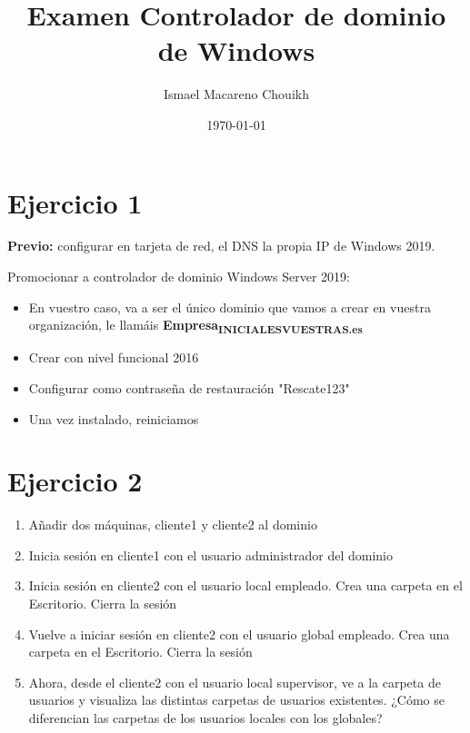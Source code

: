 \documentclass[11pt]{article}
\author{Ismael Macareno Chouikh}
\date{\today}
\title{Examen Controlador de dominio de Windows}
\begin{document}
\maketitle

\section{Ejercicio 1}
\label{sec:org68734ab}
\textbf{Previo:} configurar en tarjeta de red, el DNS la propia IP de Windows 2019.

Promocionar a controlador de dominio Windows Server 2019:
\begin{itemize}
\item En vuestro caso, va a ser el único dominio que vamos a crear en vuestra organización, le llamáis \textbf{Empresa\textsubscript{INICIALESVUESTRAS.es}}
\item Crear con nivel funcional 2016
\item Configurar como contraseña de restauración "Rescate123"
\item Una vez instalado, reiniciamos
\end{itemize}


\section{Ejercicio 2}
\label{sec:org2b82291}
\begin{enumerate}
\item Añadir dos máquinas, cliente1 y cliente2 al dominio
\item Inicia sesión en cliente1 con el usuario administrador del dominio
\item Inicia sesión en cliente2 con el usuario local empleado. Crea una carpeta en el Escritorio. Cierra la sesión
\item Vuelve a iniciar sesión en cliente2 con el usuario global empleado. Crea una carpeta en el Escritorio. Cierra la sesión
\item Ahora, desde el cliente2 con el usuario local supervisor, ve a la carpeta de usuarios y visualiza las distintas carpetas de usuarios existentes. ¿Cómo se diferencian las carpetas
de los usuarios locales con los globales?
\end{enumerate}
\end{document}
